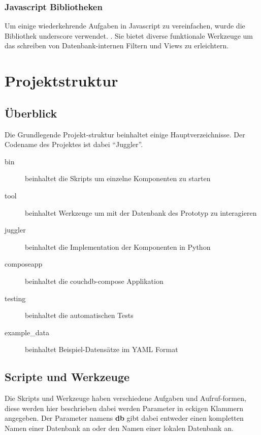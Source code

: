 \subsubsection{Javascript Bibliotheken}

Um einige wiederkehrende Aufgaben in Javascript zu vereinfachen,
wurde die Bibliothek underscore verwendet. \cite{javascript:underscore}.
Sie bietet diverse funktionale Werkzeuge um das schreiben
von Datenbank-internen Filtern und Views zu erleichtern.


\section{Projektstruktur}
\subsection{Überblick}

Die Grundlegende Projekt-struktur beinhaltet einige Hauptverzeichnisse.
Der Codename des Projektes ist dabei ``Juggler''.


\begin{description}
    \item[bin] beinhaltet die Skripts um einzelne Komponenten zu starten
    \item[tool] beinhaltet Werkzeuge um mit der Datenbank des Prototyp zu interagieren
    \item[juggler] beinhaltet die Implementation der Komponenten in Python
    \item[composeapp] beinhaltet die couchdb-compose Applikation
    \item[testing] beinhaltet die automatischen Tests
    \item[example\_data] beinhaltet Beispiel-Datensätze im YAML Format
\end{description}

\subsection{Scripte und Werkzeuge}
Die Skripts und Werkzeuge haben verschiedene Aufgaben und Aufruf-formen,
diese werden hier beschrieben dabei werden Parameter in eckigen Klammern angegeben.
Der Parameter namens \textbf{db} gibt dabei entweder einen kompletten Namen einer  Datenbank an oder den Namen einer lokalen Datenbank an.

